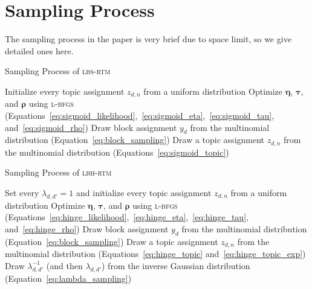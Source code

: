 \section{Sampling Process}
\label{sec:sampling}

The sampling process in the paper is very brief due to space limit, so we give detailed ones here.

\begin{algorithm}[H]
\caption{Sampling Process of \textsc{lbs-rtm}}\label{alg:sigmoid_sampling}
\begin{algorithmic}[1]
    \State Initialize every topic assignment $z_{d,n}$ from a uniform distribution
        \State Optimize $\bm{\eta}$, $\bm{\tau}$, and $\bm{\rho}$ using \textsc{l-bfgs} (Equations~\ref{eq:sigmoid_likelihood},~\ref{eq:sigmoid_eta},~\ref{eq:sigmoid_tau}, and~\ref{eq:sigmoid_rho})
            \State Draw block assignment $y_d$ from the multinomial distribution (Equation~\ref{eq:block_sampling})
                \State Draw a topic assignment $z_{d,n}$ from the multinomial distribution (Equations~\ref{eq:sigmoid_topic})
            \EndFor
        \EndFor
    \EndFor
\end{algorithmic}
\end{algorithm}

\begin{algorithm}[H]
\caption{Sampling Process of \textsc{lbh-rtm}}\label{alg:hinge_sampling}
\begin{algorithmic}[1]
    \State Set every $\lambda_{d,d'}=1$ and initialize every topic assignment $z_{d,n}$ from a uniform distribution
        \State Optimize $\bm{\eta}$, $\bm{\tau}$, and $\bm{\rho}$ using \textsc{l-bfgs} (Equations~\ref{eq:hinge_likelihood},~\ref{eq:hinge_eta},~\ref{eq:hinge_tau}, and~\ref{eq:hinge_rho})
            \State Draw block assignment $y_d$ from the multinomial distribution (Equation~\ref{eq:block_sampling})
                \State Draw a topic assignment $z_{d,n}$ from the multinomial distribution (Equations~\ref{eq:hinge_topic} and~\ref{eq:hinge_topic_exp})
            \EndFor
                \State Draw $\lambda_{d,d'}^{-1}$ (and then $\lambda_{d,d'}$) from the inverse Gaussian distribution (Equation~\ref{eq:lambda_sampling})
            \EndFor
        \EndFor
    \EndFor
\end{algorithmic}
\end{algorithm} 